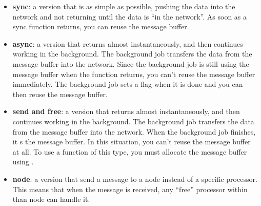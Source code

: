 \begin{itemize}

\item{{\bf sync}: a version that is as simple as possible, pushing the
data into the network and not returning until the data is ``in the
network''.  As soon as a sync function returns, you can reuse the
message buffer.}

\item{{\bf async}: a version that returns almost instantaneously, and then
continues working in the background.  The background job transfers the
data from the message buffer into the network.  Since the background job
is still using the message buffer when the function returns, you can't
reuse the message buffer immediately.  The background job sets a flag
when it is done and you can then reuse the message buffer.}

\item{{\bf send and free}: a version that returns almost instantaneously,
and then continues working in the background.  The background job
transfers the data from the message buffer into the network.  When the
background job finishes, it s the message buffer.  In
this situation, you can't reuse the message buffer at all. 
To use a function of this type, you must allocate the message buffer
using .}

\item{{\bf node}\experimental{}: a version that send a message to a node 
instead of a
specific processor. This means that when the message is received, any ``free''
processor within than node can handle it.}

\end{itemize}




